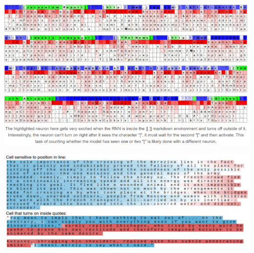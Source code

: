 \documentclass[fullscreen=true, bookmarks=true, hyperref={pdfencoding=unicode}]{beamer}
\begin{document}
\begin{frame}
  \includegraphics[keepaspectratio,
                   width=.85\paperwidth]{bracket_neuron.png}

\end{frame}


\begin{frame}
  \includegraphics[keepaspectratio,
                   width=.85\paperwidth]{cell_endline.png}

\end{frame}
\end{document}
